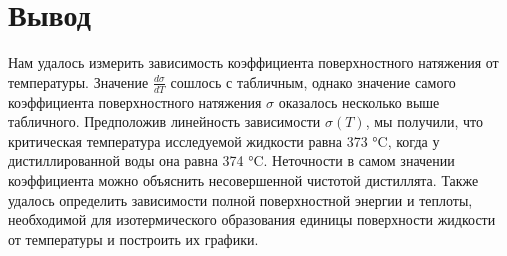 \documentclass[a4paper, 12pt]{article}
\begin{document}
	\section*{Вывод}
		Нам удалось измерить зависимость коэффициента поверхностного натяжения от температуры. Значение $\frac{d \sigma}{dT}$ сошлось с табличным, однако значение самого коэффициента поверхностного натяжения $\sigma$ оказалось несколько выше табличного. Предположив линейность зависимости $\sigma (T)$, мы получили, что критическая температура исследуемой жидкости равна 373 °C, когда у дистиллированной воды она равна 374 °C. Неточности в самом значении коэффициента можно объяснить несовершенной чистотой дистиллята. Также удалось определить зависимости полной поверхностной энергии и теплоты, необходимой для изотермического образования единицы поверхности жидкости от температуры и построить их графики. 
\end{document}

